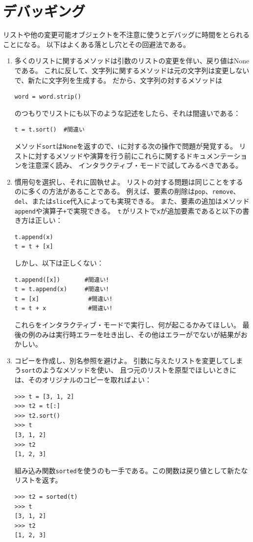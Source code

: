 \documentclass[a4j,12pt,makeidx]{jbook}
\begin{document}
\section{デバッギング}
リストや他の変更可能オブジェクトを不注意に使うとデバッグに時間をとられることになる。
以下はよくある落とし穴とその回避法である。
\begin{enumerate}
\item 多くのリストに関するメソッドは引数のリストの変更を伴い、戻り値はNoneである。
これに反して、文字列に関するメソッドは元の文字列は変更しないで、新たに文字列を生成する。
だから、文字列の対するメソッドは
\begin{verbatim}
word = word.strip()
\end{verbatim}
のつもりでリストにも以下のような記述をしたら、それは間違いである：
\begin{verbatim}
t = t.sort()  #間違い
\end{verbatim}
メソッド{\tt sort}は{\tt None}を返すので、tに対する次の操作で問題が発覚する。
リストに対するメソッドや演算を行う前にこれらに関するドキュメンテーションを注意深く読み、
インタラクティブ・モードで試してみるべきである。
\item 慣用句を選択し、それに固執せよ。
リストの対する問題は同じことをするのに多くの方法があることである。
例えば、要素の削除は{\tt pop}、{\tt remove}、{\tt del}、または{\tt slice}代入によっても実現できる。
また、要素の追加はメソッド{\tt append}や演算子{\tt +}で実現できる。
{\tt ｔ}がリストで{\tt x}が追加要素であると以下の書き方は正しい：
\begin{verbatim}
t.append(x)
t = t + [x]
\end{verbatim}
しかし、以下は正しくない：
\begin{verbatim}
t.append([x])       #間違い!
t = t.append(x)     #間違い!
t = [x]              #間違い!
t = t + x            #間違い!
\end{verbatim}
これらをインタラクティブ・モードで実行し、何が起こるかみてほしい。
最後の例のみは実行時エラーを吐き出し、その他はエラーがでないが結果がおかしい。
\item コピーを作成し、別名参照を避けよ。
引数に与えたリストを変更してしまう{\tt sort}のようなメソッドを使い、
且つ元のリストを原型でほしいときには、そのオリジナルのコピーを取ればよい：
\begin{verbatim}
>>> t = [3, 1, 2]
>>> t2 = t[:]
>>> t2.sort()
>>> t
[3, 1, 2]
>>> t2
[1, 2, 3]
\end{verbatim}
組み込み関数{\tt sorted}を使うのも一手である。この関数は戻り値として新たなリストを返す。
\begin{verbatim}
>>> t2 = sorted(t)
>>> t
[3, 1, 2]
>>> t2
[1, 2, 3]
\end{verbatim}
%
\end{enumerate}
%
\end{document}
